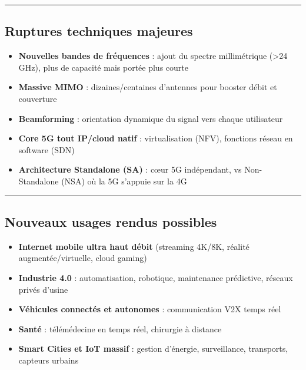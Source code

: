 \documentclass[
]{article}
\providecommand{\tightlist}{%
  \setlength{\itemsep}{0pt}\setlength{\parskip}{0pt}}
\begin{document}
\begin{center}\rule{0.5\linewidth}{0.5pt}\end{center}

\subsection{Ruptures techniques
majeures}\label{ruptures-techniques-majeures}

\begin{itemize}
\tightlist
\item
  \textbf{Nouvelles bandes de fréquences} : ajout du spectre
  millimétrique (\textgreater24 GHz), plus de capacité mais portée plus
  courte
\item
  \textbf{Massive MIMO} : dizaines/centaines d'antennes pour booster
  débit et couverture
\item
  \textbf{Beamforming} : orientation dynamique du signal vers chaque
  utilisateur
\item
  \textbf{Core 5G tout IP/cloud natif} : virtualisation (NFV), fonctions
  réseau en software (SDN)
\item
  \textbf{Architecture Standalone (SA)} : cœur 5G indépendant, vs
  Non-Standalone (NSA) où la 5G s'appuie sur la 4G
\end{itemize}

\begin{center}\rule{0.5\linewidth}{0.5pt}\end{center}

\subsection{Nouveaux usages rendus
possibles}\label{nouveaux-usages-rendus-possibles}

\begin{itemize}
\tightlist
\item
  \textbf{Internet mobile ultra haut débit} (streaming 4K/8K, réalité
  augmentée/virtuelle, cloud gaming)
\item
  \textbf{Industrie 4.0} : automatisation, robotique, maintenance
  prédictive, réseaux privés d'usine
\item
  \textbf{Véhicules connectés et autonomes} : communication V2X temps
  réel
\item
  \textbf{Santé} : télémédecine en temps réel, chirurgie à distance
\item
  \textbf{Smart Cities et IoT massif} : gestion d'énergie, surveillance,
  transports, capteurs urbains
\end{itemize}
\end{document}
